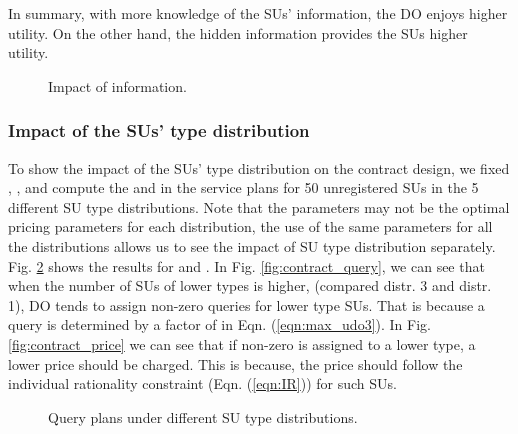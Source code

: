 \documentclass[journal]{IEEEtran}
\begin{document}
In summary, with more knowledge of the SUs' information, the DO enjoys higher utility. On the other hand, the hidden information provides the SUs higher utility.

\begin{figure}[t]
\centering
{}\caption{Impact of information.}
\label{fig:information}
\vspace{-0.0cm}
\end{figure}

\subsubsection{Impact of the SUs' type distribution}

To show the impact of the SUs' type distribution on the contract design, we fixed , ,  and compute the  and  in the service plans for 50 unregistered SUs in the 5 different SU type distributions. Note that the parameters may not be the optimal pricing parameters for each distribution, the use of the same parameters for all the distributions allows us to see the impact of SU type distribution separately. Fig. \ref{fig:contract} shows the results for  and . In Fig. \ref{fig:contract_query}, we can see that when the number of SUs of lower types is higher, (compared distr. 3 and distr. 1), DO tends to assign non-zero queries for lower type SUs. That is because a query  is determined by a factor of  in Eqn. (\ref{eqn:max_udo3}). In Fig. \ref{fig:contract_price} we can see that if non-zero  is assigned to a lower type, a lower price  should be charged. This is because, the price should follow the individual rationality constraint (Eqn. (\ref{eqn:IR})) for such SUs.

\begin{figure}[t]
\centering
{}\caption{Query plans under different SU type distributions.}
\label{fig:contract}
\vspace{-0.0cm}
\end{figure}
\end{document}
